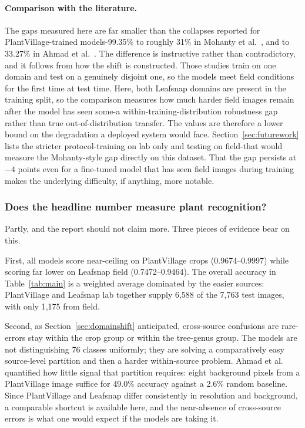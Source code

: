 \documentclass[12pt,a4paper]{article}
\begin{document}
\paragraph{Comparison with the literature.} The gaps measured here are far smaller than the collapses reported for PlantVillage-trained models-99.35\% to roughly 31\% in Mohanty et al.~\cite{mohanty2016}, and to 33.27\% in Ahmad et al.~\cite{ahmad2023}. The difference is instructive rather than contradictory, and it follows from how the shift is constructed. Those studies train on one domain and test on a genuinely disjoint one, so the models meet field conditions for the first time at test time. Here, both Leafsnap domains are present in the training split, so the comparison measures how much harder field images remain after the model has seen some-a within-training-distribution robustness gap rather than true out-of-distribution transfer. The values are therefore a lower bound on the degradation a deployed system would face. Section~\ref{sec:futurework} lists the stricter protocol-training on lab only and testing on field-that would measure the Mohanty-style gap directly on this dataset. That the gap persists at $-4$ points even for a fine-tuned model that has seen field images during training makes the underlying difficulty, if anything, more notable.

\subsubsection{Does the headline number measure plant recognition?}
Partly, and the report should not claim more. Three pieces of evidence bear on this.

First, all models score near-ceiling on PlantVillage crops (0.9674--0.9997) while scoring far lower on Leafsnap field (0.7472--0.9464). The overall accuracy in Table~\ref{tab:main} is a weighted average dominated by the easier sources: PlantVillage and Leafsnap lab together supply 6{,}588 of the 7{,}763 test images, with only 1{,}175 from field.

Second, as Section~\ref{sec:domainshift} anticipated, cross-source confusions are rare-errors stay within the crop group or within the tree-genus group. The models are not distinguishing 76 classes uniformly; they are solving a comparatively easy source-level partition and then a harder within-source problem. Ahmad et al.~\cite{ahmad2023} quantified how little signal that partition requires: eight background pixels from a PlantVillage image suffice for 49.0\% accuracy against a 2.6\% random baseline. Since PlantVillage and Leafsnap differ consistently in resolution and background, a comparable shortcut is available here, and the near-absence of cross-source errors is what one would expect if the models are taking it.
\end{document}
